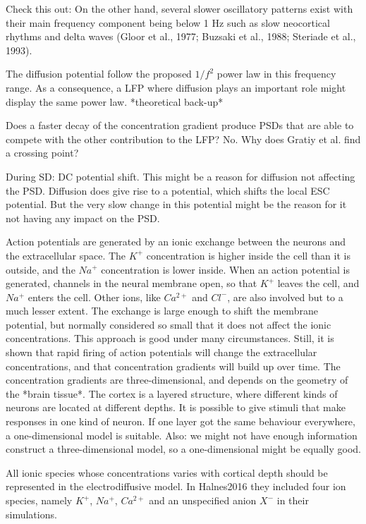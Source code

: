 \documentclass{article}
\begin{document}
Check this out: On the
other hand, several slower oscillatory patterns exist with their main
frequency component being below 1 Hz such as slow neocortical
rhythms and delta waves (Gloor et al., 1977; Buzsaki et al., 1988;
Steriade et al., 1993).

The diffusion potential follow the proposed  $1/f^2$ power law in this frequency range. As a consequence, a LFP where diffusion plays an important role might display the same power law.  *theoretical back-up*

Does a faster decay of the concentration gradient produce PSDs that are able to compete with the other contribution to the LFP? No. Why does Gratiy et al. find a crossing point? 


During SD: DC potential shift. This might be a reason for diffusion not affecting the PSD. Diffusion does give rise to a potential, which shifts the local ESC potential. But the very slow change in this potential might be the reason for it not having any impact on the PSD.


Action potentials are generated by an ionic exchange between the neurons and the extracellular space. The $K^+$ concentration is higher inside the cell than it is outside, and the $Na^+$ concentration is lower inside. When an action potential is generated,  channels in the neural membrane open, so that $K^+$ leaves the cell, and $Na^+$ enters the cell. Other ions, like $Ca^{2+}$ and $Cl^-$, are also involved but to a much lesser extent. The exchange is large enough to shift the membrane potential, but normally considered so small that it does not affect the ionic concentrations. This approach is good under many circumstances. Still, it is shown that rapid firing of action potentials will change the extracellular concentrations, and that concentration gradients will build up over time. The concentration gradients are three-dimensional, and depends on the geometry of the *brain tissue*.  The cortex is a layered structure, where different kinds of neurons are located at different depths. It is possible to give stimuli that make responses in one kind of neuron. If one layer got the same behaviour everywhere, a one-dimensional model is suitable. Also: we might not have enough information construct a three-dimensional model, so a one-dimensional might be equally good. 

All ionic species whose concentrations varies with cortical depth should be represented in the electrodiffusive model. In Halnes2016 they included four ion species, namely $K^+$, $Na^+$, $Ca^{2+}$ and an unspecified anion $X^-$ in their simulations.
\end{document}
